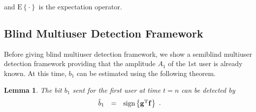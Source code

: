 \documentclass[a4paper,11pt,fleqn]{article}
\newtheorem{lemma}{Lemma}
\newcommand{\bg}{{\bf g}}
\newcommand{\bbf}{{\bf f}}
\begin{document}
\noindent and $\mbox{E}\left\{\cdot\right\}$ is the expectation
operator.


\subsection{Blind Multiuser Detection Framework}

Before giving blind multiuser detection framework, we show a
semiblind multiuser detection framework providing that the
amplitude $A_1$ of the $1$st user is already known. At this time,
$b_1$ can be estimated using the following theorem.


\begin{lemma}
The bit $b_1$ sent for the first user at time $t=n$ can be
detected by
\begin{equation}
\begin{array}{rcl}
\hat{b}_1 &=& \mbox{sign}\left\{\bg^{\rm T}\bbf\right\}
\end{array}.
\end{equation} \label{bn_estimation}
\end{lemma}
\end{document}
